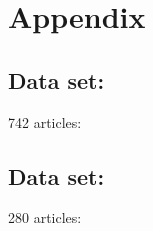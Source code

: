 \chapter{Appendix}

\section{Data set: }\label{sec:conflictsraw}
\begin{multicols}{3}\tiny
742 articles:\\

\end{multicols}

\clearpage
\section{Data set: }\label{sec:conflicts}

\begin{multicols}{3}\tiny
280 articles:\\

\end{multicols}

%
%
%
%
%
